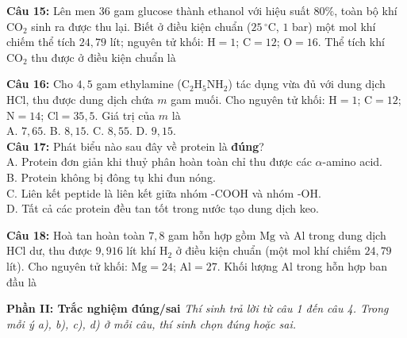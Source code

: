 \documentclass[12pt,a4paper]{article}
\begin{document}
\noindent \textbf{Câu 15:} Lên men $36$ gam glucose thành ethanol với hiệu suất $80\%$, toàn bộ khí $\text{CO}_2$ sinh ra được thu lại. Biết ở điều kiện chuẩn ($25\,^{\circ}\text{C}$, $1$ bar) một mol khí chiếm thể tích $24{,}79$ lít; nguyên tử khối: $\text{H} = 1$; $\text{C} = 12$; $\text{O} = 16$. Thể tích khí $\text{CO}_2$ thu được ở điều kiện chuẩn là\\
\noindent{}

\noindent \textbf{Câu 16:} Cho $4{,}5$ gam ethylamine ($\text{C}_2\text{H}_5\text{NH}_2$) tác dụng vừa đủ với dung dịch $\text{HCl}$, thu được dung dịch chứa $m$ gam muối. Cho nguyên tử khối: $\text{H} = 1$; $\text{C} = 12$; $\text{N} = 14$; $\text{Cl} = 35{,}5$. Giá trị của $m$ là\\
\noindent A. $7{,}65$. \hfill B. $8{,}15$. \hfill C. $8{,}55$. \hfill D. $9{,}15$.\\

\noindent \textbf{Câu 17:} Phát biểu nào sau đây về protein là \textbf{đúng}?\\
\noindent A. Protein đơn giản khi thuỷ phân hoàn toàn chỉ thu được các $\alpha$-amino acid.\\
\noindent B. Protein không bị đông tụ khi đun nóng.\\
\noindent C. Liên kết peptide là liên kết giữa nhóm $\text{-COOH}$ và nhóm $\text{-OH}$.\\
\noindent D. Tất cả các protein đều tan tốt trong nước tạo dung dịch keo.

\noindent \textbf{Câu 18:} Hoà tan hoàn toàn $7{,}8$ gam hỗn hợp gồm $\text{Mg}$ và $\text{Al}$ trong dung dịch $\text{HCl}$ dư, thu được $9{,}916$ lít khí $\text{H}_2$ ở điều kiện chuẩn (một mol khí chiếm $24{,}79$ lít). Cho nguyên tử khối: $\text{Mg} = 24$; $\text{Al} = 27$. Khối lượng $\text{Al}$ trong hỗn hợp ban đầu là\\
\noindent{}

\vspace{0.5cm}
\textbf{Phần II: Trắc nghiệm đúng/sai} \textit{Thí sinh trả lời từ câu 1 đến câu 4. Trong mỗi ý a), b), c), d) ở mỗi câu, thí sinh chọn đúng hoặc sai.}
\end{document}
